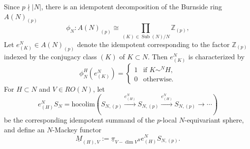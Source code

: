\documentclass{amsart}
\theoremstyle{plain}
\theoremstyle{definition}
\theoremstyle{remark}
\begin{document}
    Since $p\nmid |N|$, there is an idempotent decomposition of the Burnside ring $A(N)_{(p)}$ \cite[Appendix A]{greenlees1995generalized} 
    \[
    \phi_N\colon A(N)_{(p)}\cong \prod_{(K)\in \operatorname{Sub}(N)/N} \mathbb Z_{(p)},
    \]
    Let $e_{(K)}^N\in A(N)_{(p)}$ denote the idempotent corresponding to the factor $\mathbb Z_{(p)}$ indexed by the conjugacy class $(K)$ of $K\subset N$. Then $e_{(K)}^N$ is characterized by 
    \[
    \phi_N^H(e_{(K)}^N)=\begin{cases}
        1 & \text{if } K\sim^N H,\\
        0 & \text{otherwise.}
    \end{cases}
    \]
    For $H\subset N$ and $V\in RO(N)$, let 
    \[
    e_{(H)}^N S_N=\mathrm{hocolim}(S_{N,(p)}\overset{e_{(H)}^N}{\longrightarrow} S_{N,(p)} \overset{e_{(H)}^N}{\longrightarrow} S_{N,(p)} \longrightarrow\cdots)
    \] 
    be the corresponding idempotent summand of the $p$-local $N$-equivariant sphere, and define an $N$-Mackey functor 
    \[ \underline M_{(H),V}:=\underline{\pi}_{V-\dim V^H} e_{(H)}^N S_{N,(p)}.\]
\end{document}
